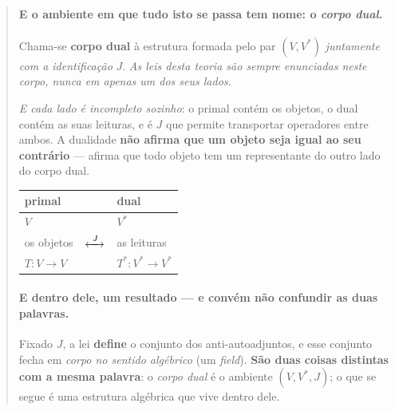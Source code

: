 \documentclass[livro.tex]{subfiles}
\begin{document}
\begin{abstract}

\paragraph{E o ambiente em que tudo isto se passa tem nome: o \emph{corpo dual}.}

\begin{definicao}\label{def:corpodual}
Chama-se \textbf{corpo dual} à estrutura formada pelo par $(V,V^{*})$ \emph{juntamente com a
identificação} $J$. \emph{As leis desta teoria são sempre enunciadas neste corpo, nunca em apenas
um dos seus lados.}
\end{definicao}

\noindent \emph{E cada lado é incompleto sozinho}: o primal contém os objetos, o dual contém as
suas leituras, e é $J$ que permite transportar operadores entre ambos. A dualidade \textbf{não
afirma que um objeto seja igual ao seu contrário} --- afirma que todo objeto tem um representante do
outro lado do corpo dual.

\begin{center}\small
\begin{tabular}{@{}lcl@{}}
\toprule
\textbf{primal} & & \textbf{dual} \\
\midrule
$V$ & & $V^{*}$ \\
os objetos & $\xleftrightarrow{\ J\ }$ & as leituras \\
$T\colon V\to V$ & & $T^{*}\colon V^{*}\to V^{*}$ \\
\bottomrule
\end{tabular}
\end{center}

\paragraph{E dentro dele, um resultado --- e convém não confundir as duas palavras.} Fixado $J$, a
lei \textbf{define} o conjunto dos anti-autoadjuntos, e esse conjunto fecha em \emph{corpo no
sentido algébrico} (um \emph{field}). \textbf{São duas coisas distintas com a mesma palavra}: o
\emph{corpo dual} é o ambiente $(V,V^{*},J)$; o que se segue é uma estrutura algébrica que vive
dentro dele.


\end{abstract}
\end{document}
